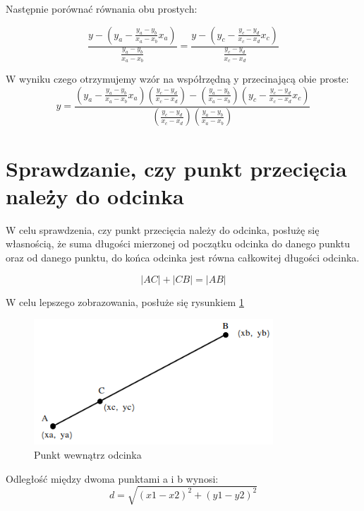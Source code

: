 Następnie porównać równania obu prostych:

\begin{equation}
\frac{y - (y_a - \frac{y_a - y_b}{x_a - x_b}x_a)}{\frac{y_a - y_b}{x_a - x_b}}=\frac{y - (y_c - \frac{y_c - y_d}{x_c - x_d}x_c)}{\frac{y_c - y_d}{x_c - x_d}}
\end{equation}

W wyniku czego otrzymujemy wzór na współrzędną y przecinającą obie proste:
\begin{equation}
y = \frac{(y_a - \frac{y_a - y_b}{x_a - x_b}x_a)(\frac{y_c - y_d}{x_c - x_d}) - (\frac{y_a - y_b}{x_a - x_b})(y_c - \frac{y_c - y_d}{x_c - x_d}x_c)}
{(\frac{y_c - y_d}{x_c - x_d})(\frac{y_a - y_b}{x_a - x_b})}
\end{equation}

\newpage
\section{Sprawdzanie, czy punkt przecięcia należy do odcinka}

W celu sprawdzenia, czy punkt przecięcia należy do odcinka, posłużę się własnością, że suma długości mierzonej od początku odcinka do danego punktu oraz od danego punktu, do końca odcinka jest równa całkowitej długości odcinka.

\begin{equation} \label{eq:pointInSegment}
|AC| + |CB| = |AB|
\end{equation}

W celu lepszego zobrazowania, posłuże się rysunkiem \ref{sec:pointSegment}

\begin{figure}[h]
\caption{Punkt wewnątrz odcinka}
\label{sec:pointSegment}
\centering
\includegraphics[width=0.8\textwidth]{pointInSegment}
\end{figure}

Odległość między dwoma punktami a i b wynosi:
\begin{equation}
d = \sqrt{(x1 - x2)^2 + (y1 - y2)^2}
\end{equation}\newline

